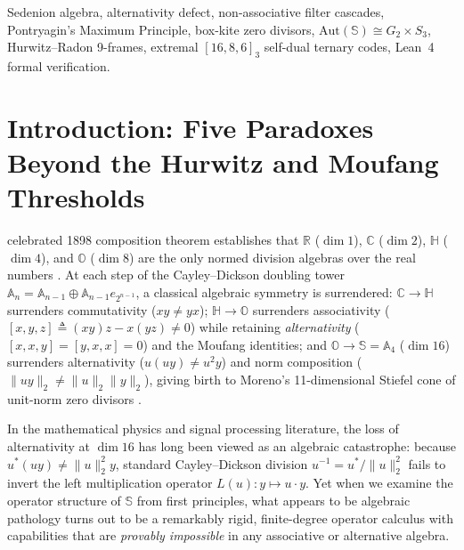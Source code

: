 \documentclass[journal,twoside]{IEEEtran}
\theoremstyle{definition}
\theoremstyle{remark}
\newcommand{\R}{\mathbb{R}}
\newcommand{\C}{\mathbb{C}}
\newcommand{\Ha}{\mathbb{H}}
\newcommand{\Oc}{\mathbb{O}}
\newcommand{\Se}{\mathbb{S}}
\newcommand{\Aut}{\mathrm{Aut}}
\begin{document}
\begin{abstract}
preserves Euclidean norm against arbitrary zero-divisor keys and reduces modulo $3$ to an extremal self-dual $[16, 8, 6]_3$ ternary code correcting all 1- and 2-trit errors on a $64\,\mathrm{MHz}$ Cortex-M4F microcontroller.
\end{abstract}

\begin{IEEEkeywords}
Sedenion algebra, alternativity defect, non-associative filter cascades, Pontryagin's Maximum Principle, box-kite zero divisors, $\Aut(\Se) \cong G_2 \times S_3$, Hurwitz--Radon 9-frames, extremal $[16,8,6]_3$ self-dual ternary codes, Lean~4 formal verification.
\end{IEEEkeywords}

\section{Introduction: Five Paradoxes Beyond the Hurwitz and Moufang Thresholds}
\label{sec:intro}
 celebrated 1898 composition theorem establishes that $\R$ ($\dim 1$), $\C$ ($\dim 2$), $\Ha$ ($\dim 4$), and $\Oc$ ($\dim 8$) are the only normed division algebras over the real numbers \cite{Baez2002}. At each step of the Cayley--Dickson doubling tower $\mathbb{A}_n = \mathbb{A}_{n-1} \oplus \mathbb{A}_{n-1} e_{2^{n-1}}$, a classical algebraic symmetry is surrendered: $\C \to \Ha$ surrenders commutativity ($xy \neq yx$); $\Ha \to \Oc$ surrenders associativity ($[x,y,z] \triangleq (xy)z - x(yz) \neq 0$) while retaining \emph{alternativity} ($[x,x,y] = [y,x,x] = 0$) and the Moufang identities; and $\Oc \to \Se = \mathbb{A}_4$ ($\dim 16$) surrenders alternativity ($u(uy) \neq u^2 y$) and norm composition ($\|uy\|_2 \neq \|u\|_2\|y\|_2$), giving birth to Moreno's 11-dimensional Stiefel cone of unit-norm zero divisors \cite{Moreno1998}.

In the mathematical physics and signal processing literature, the loss of alternativity at $\dim 16$ has long been viewed as an algebraic catastrophe: because $u^*(uy) \neq \|u\|_2^2 y$, standard Cayley--Dickson division $u^{-1} = u^*/\|u\|_2^2$ fails to invert the left multiplication operator $L(u): y \mapsto u\cdot y$. Yet when we examine the operator structure of $\Se$ from first principles, what appears to be algebraic pathology turns out to be a remarkably rigid, finite-degree operator calculus with capabilities that are \emph{provably impossible} in any associative or alternative algebra.
\end{document}
